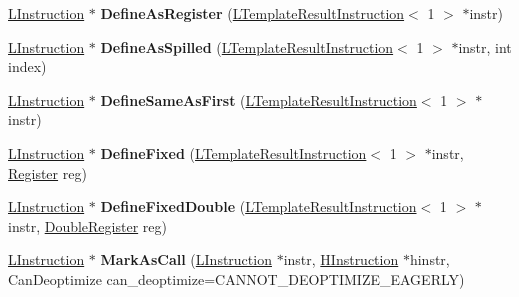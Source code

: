 \begin{DoxyCompactItemize}
\item 
\hyperlink{classv8_1_1internal_1_1_l_instruction}{L\+Instruction} $\ast$ {\bfseries Define\+As\+Register} (\hyperlink{classv8_1_1internal_1_1_l_template_result_instruction}{L\+Template\+Result\+Instruction}$<$ 1 $>$ $\ast$instr)\hypertarget{classv8_1_1internal_1_1_l_chunk_builder_af4f9a5078553b1f743899df249a25b31}{}\label{classv8_1_1internal_1_1_l_chunk_builder_af4f9a5078553b1f743899df249a25b31}

\item 
\hyperlink{classv8_1_1internal_1_1_l_instruction}{L\+Instruction} $\ast$ {\bfseries Define\+As\+Spilled} (\hyperlink{classv8_1_1internal_1_1_l_template_result_instruction}{L\+Template\+Result\+Instruction}$<$ 1 $>$ $\ast$instr, int index)\hypertarget{classv8_1_1internal_1_1_l_chunk_builder_a4e42c6b4bb935cc879f078e349ee6a1d}{}\label{classv8_1_1internal_1_1_l_chunk_builder_a4e42c6b4bb935cc879f078e349ee6a1d}

\item 
\hyperlink{classv8_1_1internal_1_1_l_instruction}{L\+Instruction} $\ast$ {\bfseries Define\+Same\+As\+First} (\hyperlink{classv8_1_1internal_1_1_l_template_result_instruction}{L\+Template\+Result\+Instruction}$<$ 1 $>$ $\ast$instr)\hypertarget{classv8_1_1internal_1_1_l_chunk_builder_a7a3e6bb64466e8d0b7062311bc13455a}{}\label{classv8_1_1internal_1_1_l_chunk_builder_a7a3e6bb64466e8d0b7062311bc13455a}

\item 
\hyperlink{classv8_1_1internal_1_1_l_instruction}{L\+Instruction} $\ast$ {\bfseries Define\+Fixed} (\hyperlink{classv8_1_1internal_1_1_l_template_result_instruction}{L\+Template\+Result\+Instruction}$<$ 1 $>$ $\ast$instr, \hyperlink{structv8_1_1internal_1_1_register}{Register} reg)\hypertarget{classv8_1_1internal_1_1_l_chunk_builder_a7dfb72b4e8c8ed4fc4acb6c8ce207af9}{}\label{classv8_1_1internal_1_1_l_chunk_builder_a7dfb72b4e8c8ed4fc4acb6c8ce207af9}

\item 
\hyperlink{classv8_1_1internal_1_1_l_instruction}{L\+Instruction} $\ast$ {\bfseries Define\+Fixed\+Double} (\hyperlink{classv8_1_1internal_1_1_l_template_result_instruction}{L\+Template\+Result\+Instruction}$<$ 1 $>$ $\ast$instr, \hyperlink{structv8_1_1internal_1_1_double_register}{Double\+Register} reg)\hypertarget{classv8_1_1internal_1_1_l_chunk_builder_aa9504301e737cc0e32d8dabaa2583e90}{}\label{classv8_1_1internal_1_1_l_chunk_builder_aa9504301e737cc0e32d8dabaa2583e90}

\item 
\hyperlink{classv8_1_1internal_1_1_l_instruction}{L\+Instruction} $\ast$ {\bfseries Mark\+As\+Call} (\hyperlink{classv8_1_1internal_1_1_l_instruction}{L\+Instruction} $\ast$instr, \hyperlink{classv8_1_1internal_1_1_h_instruction}{H\+Instruction} $\ast$hinstr, Can\+Deoptimize can\+\_\+deoptimize=C\+A\+N\+N\+O\+T\+\_\+\+D\+E\+O\+P\+T\+I\+M\+I\+Z\+E\+\_\+\+E\+A\+G\+E\+R\+LY)\hypertarget{classv8_1_1internal_1_1_l_chunk_builder_af7d51aa993ccf0b54ae1599f1bc027d1}{}\label{classv8_1_1internal_1_1_l_chunk_builder_af7d51aa993ccf0b54ae1599f1bc027d1}


\end{DoxyCompactItemize}
